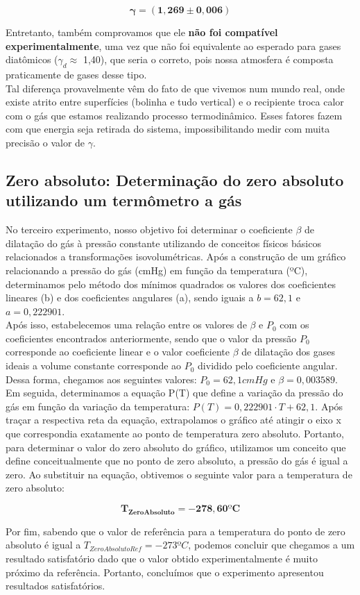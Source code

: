 \[ \mathbf{\gamma = (1,269 \pm 0,006)} \]

Entretanto, também comprovamos que ele \textbf{não foi compatível experimentalmente}, uma vez que não foi equivalente ao esperado para gases diatômicos ($\gamma_d \approx$ 1,40), que seria o correto, pois nossa atmosfera é composta praticamente de gases desse tipo.\\

Tal diferença provavelmente vêm do fato de que vivemos num mundo real, onde existe atrito entre superfícies (bolinha e tudo vertical) e o recipiente troca calor com o gás que estamos realizando processo termodinâmico. Esses fatores fazem com que energia seja retirada do sistema, impossibilitando medir com muita precisão o valor de $\gamma$.


\subsection{Zero absoluto: Determinação do zero absoluto utilizando um termômetro a
gás}

No terceiro experimento, nosso objetivo foi determinar o coeficiente $\beta$ de dilatação do gás à pressão constante utilizando de conceitos físicos básicos relacionados a transformações isovolumétricas. Após a construção de um gráfico relacionando a pressão do gás (cmHg) em função da temperatura (ºC), determinamos pelo método dos mínimos quadrados os valores dos coeficientes lineares (b) e dos coeficientes angulares (a), sendo iguais a $b = 62,1$ e $a = 0,222901$.\\

Após isso, estabelecemos uma relação entre os valores de $\beta$ e $P_0$ com os coeficientes encontrados anteriormente, sendo que o valor da pressão $P_0$ corresponde ao coeficiente linear e o valor coeficiente $\beta$ de dilatação dos gases ideais a volume constante corresponde ao $P_0$ dividido pelo coeficiente angular. Dessa forma, chegamos aos seguintes valores: $P_0 = 62,1 cmHg$ e $\beta = 0,003589$.\\

Em seguida, determinamos a equação P(T) que define a variação da pressão do gás em função da variação da temperatura: $P(T) = 0,222901 \cdot T + 62,1$. Após traçar a respectiva reta da equação, extrapolamos o gráfico até atingir o eixo x que correspondia exatamente ao ponto de temperatura zero absoluto. Portanto, para determinar o valor do zero absoluto do gráfico, utilizamos um conceito que define conceitualmente que no ponto de zero absoluto, a pressão do gás é igual a zero. Ao substituir na equação, obtivemos o seguinte valor para a temperatura de zero absoluto:

\[ \mathbf{T_{Zero Absoluto}= -278,60 ºC} \]

Por fim, sabendo que o valor de referência para a temperatura do ponto de zero absoluto é igual a $T_{Zero Absoluto Ref}= -273 ºC$, podemos concluir que chegamos a um resultado satisfatório dado que o valor obtido experimentalmente é muito próximo da referência. Portanto, concluímos que o experimento apresentou resultados satisfatórios.
